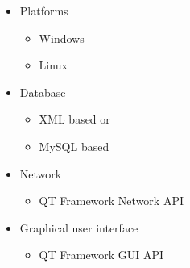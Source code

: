 \documentclass[a4paper,12pt,final]{article}
\begin{document}
\begin{itemize}

\item{Platforms}
\begin{itemize}
\item{Windows}
\item{Linux}
\end{itemize}


\item{Database}
\begin{itemize}
\item{XML based or}
\item{MySQL based}
\end{itemize}


\item{Network}
\begin{itemize}
\item{QT Framework Network API}
\end{itemize}


\item{Graphical user interface}
\begin{itemize}
\item{QT Framework GUI API}
\end{itemize}

\end{itemize}
\end{document}
